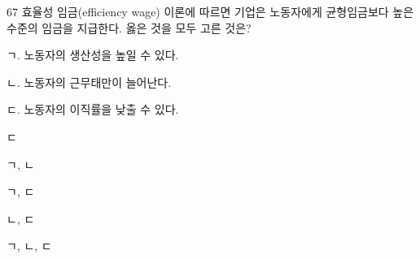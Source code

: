 \begin{question}{67}
효율성 임금(efficiency wage) 이론에 따르면 기업은 노동자에게 균형임금보다 높은 수준의 임금을 지급한다. 옳은 것을 모두 고른 것은?
\begin{framedtext}
ㄱ. 노동자의 생산성을 높일 수 있다. \par
ㄴ. 노동자의 근무태만이 늘어난다. \par
ㄷ. 노동자의 이직률을 낮출 수 있다.
\end{framedtext}
\begin{choices}
  \item ㄷ
  \item ㄱ, ㄴ
  \item ㄱ, ㄷ
  \item ㄴ, ㄷ
  \item ㄱ, ㄴ, ㄷ
\end{choices}
\end{question}
